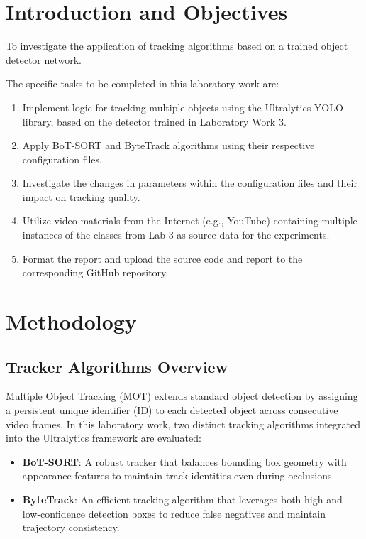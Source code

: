 \documentclass[12pt, a4paper]{article}
\begin{document}
\tableofcontents
\newpage


\section{Introduction and Objectives}

\begin{tcolorbox}[title=Laboratory Goal]
To investigate the application of tracking algorithms based on a trained object detector network.
\end{tcolorbox}

The specific tasks to be completed in this laboratory work are:
\begin{enumerate}
    \item Implement logic for tracking multiple objects using the Ultralytics YOLO library, based on the detector trained in Laboratory Work 3.
    \item Apply BoT-SORT and ByteTrack algorithms using their respective configuration files.
    \item Investigate the changes in parameters within the configuration files and their impact on tracking quality.
    \item Utilize video materials from the Internet (e.g., YouTube) containing multiple instances of the classes from Lab 3 as source data for the experiments.
    \item Format the report and upload the source code and report to the corresponding GitHub repository.
\end{enumerate}

\section{Methodology}

\subsection{Tracker Algorithms Overview}
Multiple Object Tracking (MOT) extends standard object detection by assigning a persistent unique identifier (ID) to each detected object across consecutive video frames. In this laboratory work, two distinct tracking algorithms integrated into the Ultralytics framework are evaluated:
\begin{itemize}
    \item \textbf{BoT-SORT}: A robust tracker that balances bounding box geometry with appearance features to maintain track identities even during occlusions.
    \item \textbf{ByteTrack}: An efficient tracking algorithm that leverages both high and low-confidence detection boxes to reduce false negatives and maintain trajectory consistency.
\end{itemize}
\end{document}
